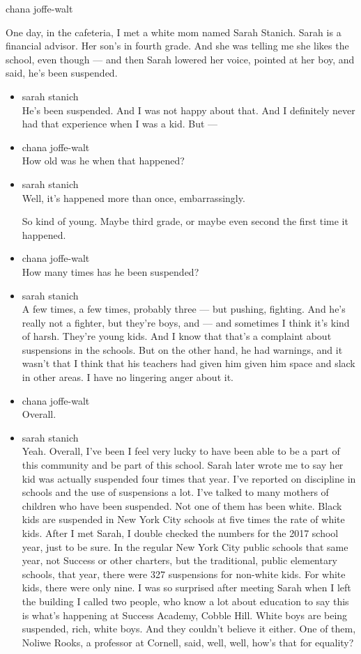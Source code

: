 chana joffe-walt

One day, in the cafeteria, I met a white mom named Sarah Stanich. Sarah
is a financial advisor. Her son's in fourth grade. And she was telling
me she likes the school, even though --- and then Sarah lowered her
voice, pointed at her boy, and said, he's been suspended.

\begin{itemize}
\item
  sarah stanich\\
  He's been suspended. And I was not happy about that. And I definitely
  never had that experience when I was a kid. But ---
\item
  chana joffe-walt\\
  How old was he when that happened?
\item
  sarah stanich\\
  Well, it's happened more than once, embarrassingly.

  So kind of young. Maybe third grade, or maybe even second the first
  time it happened.
\item
  chana joffe-walt\\
  How many times has he been suspended?
\item
  sarah stanich\\
  A few times, a few times, probably three --- but pushing, fighting.
  And he's really not a fighter, but they're boys, and --- and sometimes
  I think it's kind of harsh. They're young kids. And I know that that's
  a complaint about suspensions in the schools. But on the other hand,
  he had warnings, and it wasn't that I think that his teachers had
  given him given him space and slack in other areas. I have no
  lingering anger about it.
\item
  chana joffe-walt\\
  Overall.
\item
  sarah stanich\\
  Yeah. Overall, I've been I feel very lucky to have been able to be a
  part of this community and be part of this school. Sarah later wrote
  me to say her kid was actually suspended four times that year. I've
  reported on discipline in schools and the use of suspensions a lot.
  I've talked to many mothers of children who have been suspended. Not
  one of them has been white. Black kids are suspended in New York City
  schools at five times the rate of white kids. After I met Sarah, I
  double checked the numbers for the 2017 school year, just to be sure.
  In the regular New York City public schools that same year, not
  Success or other charters, but the traditional, public elementary
  schools, that year, there were 327 suspensions for non-white kids. For
  white kids, there were only nine. I was so surprised after meeting
  Sarah when I left the building I called two people, who know a lot
  about education to say this is what's happening at Success Academy,
  Cobble Hill. White boys are being suspended, rich, white boys. And
  they couldn't believe it either. One of them, Noliwe Rooks, a
  professor at Cornell, said, well, well, how's that for equality?


\end{itemize}
